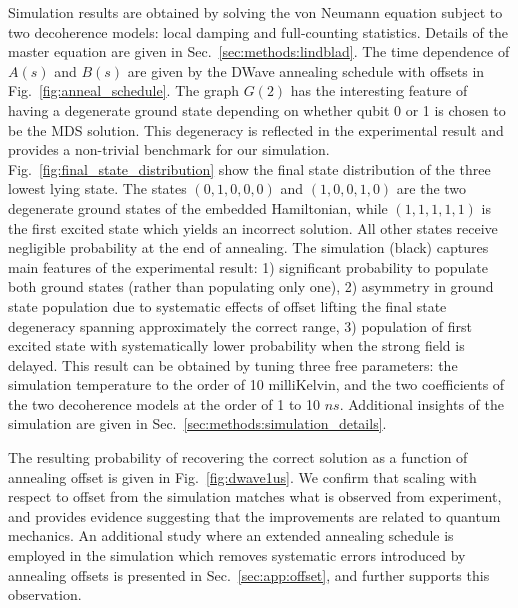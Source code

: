 \documentclass[prd,twocolumn,tightenlines,preprintnumbers,showpacs,superscriptaddress,notitlepage,nofootinbib,eqsecnum,floatfix,longbibliography,aps,10pt]{revtex4-2}
\begin{document}
Simulation results are obtained by solving the von Neumann equation subject to two decoherence models: local damping and full-counting statistics.
Details of the master equation are given in Sec.~\ref{sec:methods:lindblad}. The time dependence of $A(s)$ and $B(s)$ are given by the DWave annealing schedule with offsets in Fig.~\ref{fig:anneal_schedule}.
The graph $G(2)$ has the interesting feature of having a degenerate ground state depending on whether qubit 0 or 1 is chosen to be the MDS solution.
This degeneracy is reflected in the experimental result and provides a non-trivial benchmark for our simulation.
Fig.~\ref{fig:final_state_distribution} show the final state distribution of the three lowest lying state.
The states $(0, 1, 0, 0, 0)$ and $(1, 0, 0, 1, 0)$ are the two degenerate ground states of the embedded Hamiltonian, while $(1, 1, 1, 1, 1)$ is the first excited state which yields an incorrect solution.
All other states receive negligible probability at the end of annealing.
The simulation (black) captures main features of the experimental result: 1) significant probability to populate both ground states (rather than populating only one), 2) asymmetry in ground state population due to systematic effects of offset lifting the final state degeneracy spanning approximately the correct range, 3) population of first excited state with systematically lower probability when the strong field is delayed.
This result can be obtained by tuning three free parameters: the simulation temperature to the order of 10 milliKelvin, and the two coefficients of the two decoherence models at the order of 1 to 10 $ns$.
Additional insights of the simulation are given in Sec.~\ref{sec:methods:simulation_details}.

The resulting probability of recovering the correct solution as a function of annealing offset is given in Fig.~\ref{fig:dwave1us}.
We confirm that scaling with respect to offset from the simulation matches what is observed from experiment, and provides evidence suggesting that the improvements are related to quantum mechanics.
An additional study where an extended annealing schedule is employed in the simulation which removes systematic errors introduced by annealing offsets is presented in Sec.~\ref{sec:app:offset}, and further supports this observation.
\end{document}
